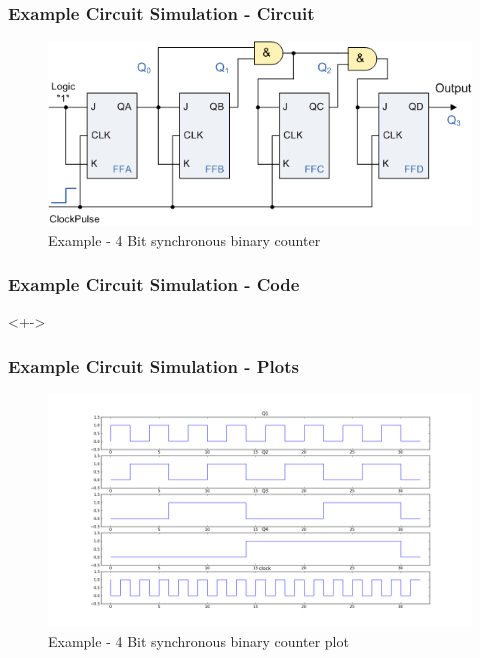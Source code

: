\documentclass[10pt,red]{beamer}
\begin{document}
\begin{frame}
 \frametitle{Example Circuit Simulation - Circuit}
\begin{figure}
   \begin{center}
   \includegraphics[scale=0.33]{cou4.png}
    \caption{\scriptsize{Example - 4 Bit synchronous binary counter }}
  \end{center}
  \end{figure}

\end{frame}

\begin{frame}
 \frametitle{Example Circuit Simulation - Code}

\begin{block}<+->{}

\begin{listing}
 
\end{listing}

\end{block}


\end{frame}


\begin{frame}
 \frametitle{Example Circuit Simulation - Plots}
\begin{figure}
   \begin{center}
   \includegraphics[scale=0.25]{cou44.png}
    \caption{\scriptsize{Example - 4 Bit synchronous binary counter plot}}
  \end{center}
  \end{figure}

\end{frame}
\end{document}
